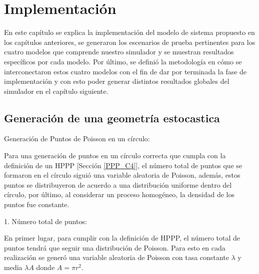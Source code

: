 
\chapter{Implementación} %

\label{Chapter6} %

En este capítulo se explica la implementación del modelo de sistema propuesto en los capítulos anteriores, se generaron los escenarios de prueba pertinentes para los cuatro modelos que comprende nuestro simulador y se muestran resultados específicos por cada modelo. Por último, se definió la metodología en cómo se interconectaron estos cuatro modelos con el fin de dar por terminada la fase de implementación y con esto poder generar distintos resultados globales del simulador en el capítulo siguiente.


\section{Generación de una geometría estocastica}\label{generarGeoEstocastica}

Generación de Puntos de Poisson en un círculo: \newline

Para una generación de puntos en un círculo correcta que cumpla con la definición de un HPPP [Sección \ref{PPP_C4}], el número total de puntos que se formaron en el círculo siguió una variable aleatoria de Poisson, además, estos puntos se distribuyeron de acuerdo a una distribución uniforme dentro del círculo, por último, al considerar un proceso homogéneo, la densidad de los puntos fue constante.\newline

1. Número total de puntos:\newline

En primer lugar, para cumplir con la definición de HPPP, el número total de puntos tendrá que seguir una distribución de Poisson. Para esto en cada realización se generó una variable aleatoria de Poisson con tasa constante $\lambda$ y media $\lambda A$ donde $A=\pi r^{2}$. \newline

